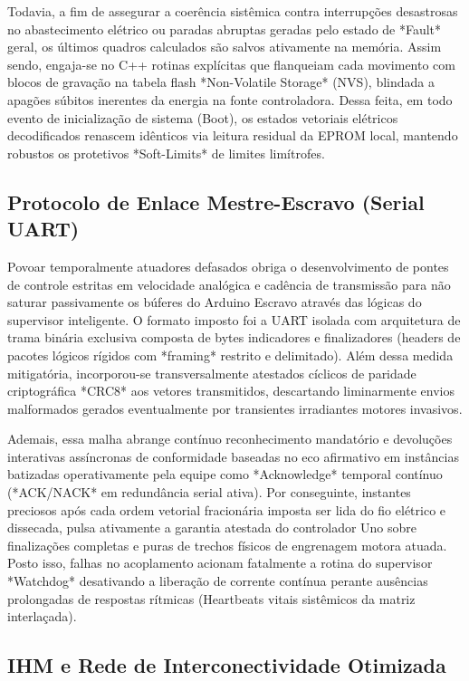 Todavia, a fim de assegurar a coerência sistêmica contra interrupções desastrosas no abastecimento elétrico ou paradas abruptas geradas pelo estado de *Fault* geral, os últimos quadros calculados são salvos ativamente na memória. Assim sendo, engaja-se no C++ rotinas explícitas que flanqueiam cada movimento com blocos de gravação na tabela flash *Non-Volatile Storage* (NVS), blindada a apagões súbitos inerentes da energia na fonte controladora. Dessa feita, em todo evento de inicialização de sistema (Boot), os estados vetoriais elétricos decodificados renascem idênticos via leitura residual da EPROM local, mantendo robustos os protetivos *Soft-Limits* de limites limítrofes.

\subsection{Protocolo de Enlace Mestre-Escravo (Serial UART)}

Povoar temporalmente atuadores defasados obriga o desenvolvimento de pontes de controle estritas em velocidade analógica e cadência de transmissão para não saturar passivamente os búferes do Arduino Escravo através das lógicas do supervisor inteligente. O formato imposto foi a UART isolada com arquitetura de trama binária exclusiva composta de bytes indicadores e finalizadores (headers de pacotes lógicos rígidos com *framing* restrito e delimitado). Além dessa medida mitigatória, incorporou-se transversalmente atestados cíclicos de paridade criptográfica *CRC8* aos vetores transmitidos, descartando liminarmente envios malformados gerados eventualmente por transientes irradiantes motores invasivos.

Ademais, essa malha abrange contínuo reconhecimento mandatório e devoluções interativas assíncronas de conformidade baseadas no eco afirmativo em instâncias batizadas operativamente pela equipe como *Acknowledge* temporal contínuo (*ACK/NACK* em redundância serial ativa). Por conseguinte, instantes preciosos após cada ordem vetorial fracionária imposta ser lida do fio elétrico e dissecada, pulsa ativamente a garantia atestada do controlador Uno sobre finalizações completas e puras de trechos físicos de engrenagem motora atuada. Posto isso, falhas no acoplamento acionam fatalmente a rotina do supervisor *Watchdog* desativando a liberação de corrente contínua perante ausências prolongadas de respostas rítmicas (Heartbeats vitais sistêmicos da matriz interlaçada).

\subsection{IHM e Rede de Interconectividade Otimizada}

